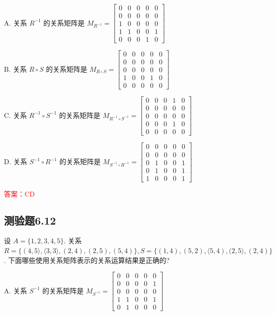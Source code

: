 \documentclass[UTF8, heading=true]{ctexart}
\begin{document}
A. 关系 $R^{-1}$ 的关系矩阵是 $M_{R^{-1}}=\left[\begin{array}{lllll}0 & 0 & 0 & 0 & 0 \\ 0 & 0 & 0 & 0 & 0 \\ 1 & 0 & 0 & 0 & 0 \\ 1 & 1 & 0 & 0 & 1 \\ 0 & 0 & 0 & 1 & 0\end{array}\right]$

B. 关系 $R \circ S$ 的关系矩阵是 $M_{R \circ S}=\left[\begin{array}{ccccc}0 & 0 & 0 & 0 & 0 \\ 0 & 0 & 0 & 0 & 0 \\ 0 & 0 & 0 & 0 & 0 \\ 1 & 0 & 0 & 1 & 0 \\ 0 & 0 & 0 & 0 & 0\end{array}\right]$

C. 关系 $R^{-1} \circ S^{-1}$ 的关系矩阵是 $M_{R^{-1} \circ S^{-1}}=\left[\begin{array}{ccccc}0 & 0 & 0 & 1 & 0 \\ 0 & 0 & 0 & 0 & 0 \\ 0 & 0 & 0 & 0 & 0 \\ 0 & 0 & 0 & 1 & 0 \\ 0 & 0 & 0 & 0 & 0\end{array}\right]$

D. 关系 $S^{-1} \circ R^{-1}$ 的关系矩阵是 $M_{S^{-1} \circ R^{-1}}=\left[\begin{array}{ccccc}0 & 0 & 0 & 0 & 0 \\ 0 & 0 & 0 & 0 & 0 \\ 0 & 1 & 0 & 0 & 1 \\ 0 & 1 & 0 & 0 & 1 \\ 1 & 0 & 0 & 0 & 1\end{array}\right]$

\textcolor{red}{答案：CD}

\subsection{测验题6.12}

设 $A=\{1,2,3,4,5\}$. 关系 $R=\{(4,5\rangle,\langle 3,3\rangle,(2,4),(2,5),(5,4)\}, S=\{(1,4),(5,2),\langle 5,4),(2,5\rangle,(2,4)\}$.
下面哪些使用关系矩阵表示的关系运算结果是正确的?

A. 关系 $S^{-1}$ 的关系矩阵是 $M_{S^{-1}}=\left[\begin{array}{ccccc}0 & 0 & 0 & 0 & 0 \\ 0 & 0 & 0 & 0 & 1 \\ 0 & 0 & 0 & 0 & 0 \\ 1 & 1 & 0 & 0 & 1 \\ 0 & 1 & 0 & 0 & 0\end{array}\right]$
\end{document}
